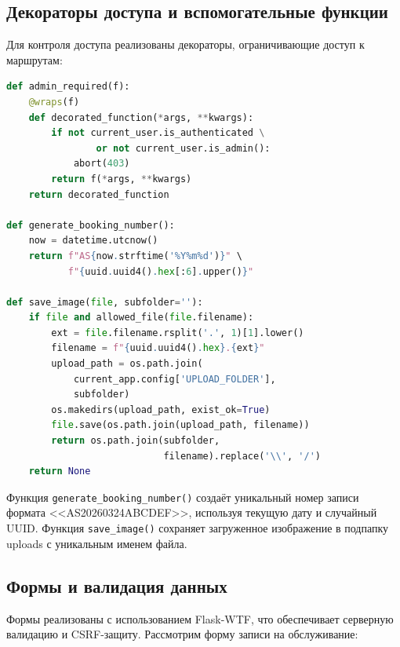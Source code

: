 \documentclass[14pt,a4paper,oneside]{extarticle}
\begin{document}
\subsection{Декораторы доступа и вспомогательные функции}

Для контроля доступа реализованы декораторы, ограничивающие доступ к маршрутам:

\begin{lstlisting}[language=Python, caption={Декоратор проверки прав администратора (utils.py)}, label={lst:decorators}]
def admin_required(f):
    @wraps(f)
    def decorated_function(*args, **kwargs):
        if not current_user.is_authenticated \
                or not current_user.is_admin():
            abort(403)
        return f(*args, **kwargs)
    return decorated_function

def generate_booking_number():
    now = datetime.utcnow()
    return f"AS{now.strftime('%Y%m%d')}" \
           f"{uuid.uuid4().hex[:6].upper()}"

def save_image(file, subfolder=''):
    if file and allowed_file(file.filename):
        ext = file.filename.rsplit('.', 1)[1].lower()
        filename = f"{uuid.uuid4().hex}.{ext}"
        upload_path = os.path.join(
            current_app.config['UPLOAD_FOLDER'],
            subfolder)
        os.makedirs(upload_path, exist_ok=True)
        file.save(os.path.join(upload_path, filename))
        return os.path.join(subfolder,
                            filename).replace('\\', '/')
    return None
\end{lstlisting}

Функция \texttt{generate\_booking\_number()} создаёт уникальный номер записи формата <<AS20260324ABCDEF>>, используя текущую дату и случайный UUID. Функция \texttt{save\_image()} сохраняет загруженное изображение в подпапку uploads с уникальным именем файла.

\subsection{Формы и валидация данных}

Формы реализованы с использованием Flask-WTF, что обеспечивает серверную валидацию и CSRF-защиту. Рассмотрим форму записи на обслуживание:
\end{document}
